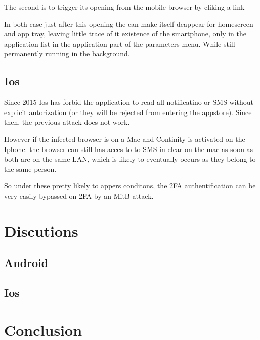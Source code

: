 \documentclass[11pt, a4paper,twocolumn]{article}
\begin{document}
The second is to trigger its opening from the mobile browser by cliking a link

In both case just after this opening the can make itself deappear for homescreen and app tray, leaving little trace of it existence of the smartphone, only in the application list in the application part of the parameters menu. While still permanently running in the background.

\subsection{Ios}
Since 2015 Ios has forbid the application to read all 
notificatino or SMS without explicit autorization (or they will be rejected from entering the appstore). 
Since then, the previous attack does not work. 

However if the infected browser is on a Mac and Continity 
is activated on the Iphone. the browser can still has acces to to SMS in clear 
on the mac as soon as both are on the same LAN, which is likely to eventually occurs
as they belong to the same person. 

So under these pretty likely to appers conditons, the 2FA authentification can 
be very easily bypassed on 2FA by an MitB attack.


\section{Discutions} 
\subsection{Android}
\subsection{Ios}
\section{Conclusion}

 

\end{document}

